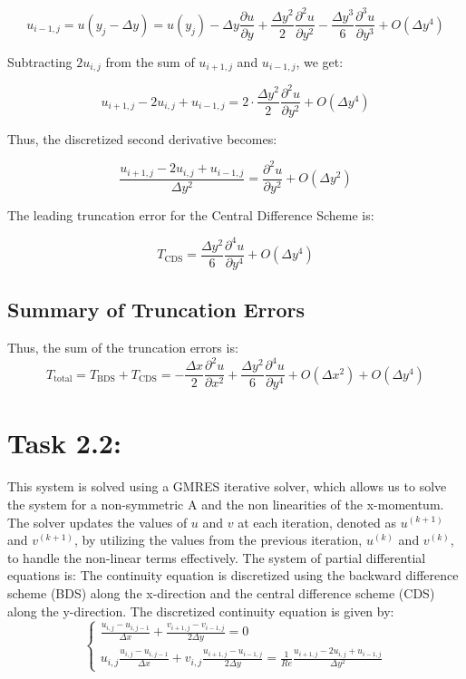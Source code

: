 \documentclass{article}
\begin{document}
\[
u_{i-1,j} = u(y_j - \Delta y) = u(y_j) - \Delta y \frac{\partial u}{\partial y} + \frac{\Delta y^2}{2} \frac{\partial^2 u}{\partial y^2} - \frac{\Delta y^3}{6} \frac{\partial^3 u}{\partial y^3} + O(\Delta y^4)
\]

Subtracting \( 2u_{i,j} \) from the sum of \( u_{i+1,j} \) and \( u_{i-1,j} \), we get:

\[
u_{i+1,j} - 2u_{i,j} + u_{i-1,j} = 2 \cdot \frac{\Delta y^2}{2} \frac{\partial^2 u}{\partial y^2} + O(\Delta y^4)
\]

Thus, the discretized second derivative becomes:

\[
\frac{u_{i+1,j} - 2u_{i,j} + u_{i-1,j}}{\Delta y^2} = \frac{\partial^2 u}{\partial y^2} + O(\Delta y^2)
\]

The leading truncation error for the Central Difference Scheme is:

\[
T_{\text{CDS}} = \frac{\Delta y^2}{6} \frac{\partial^4 u}{\partial y^4} + O(\Delta y^4)
\]
\subsection*{Summary of Truncation Errors}

Thus, the sum of the truncation errors is:
\[
T_{\text{total}} = T_{\text{BDS}} + T_{\text{CDS}} = -\frac{\Delta x}{2} \frac{\partial^2 u}{\partial x^2} + \frac{\Delta y^2}{6} \frac{\partial^4 u}{\partial y^4} + O(\Delta x^2) + O(\Delta y^4)
\]

\section*{\Large Task 2.2:}
This system is solved using a GMRES iterative solver, which allows us to solve the system for a non-symmetric A and the non linearities of the x-momentum.
The solver updates the values of \( u \) and \( v \) at each iteration, denoted as \( u^{(k+1)} \) and \( v^{(k+1)} \), by utilizing the values from the previous iteration, \( u^{(k)} \) and \( v^{(k)} \), to handle the non-linear terms effectively.
The system of partial differential equations is:
The continuity equation is discretized using the backward difference scheme (BDS) along the x-direction and the central difference scheme (CDS) along the y-direction. The discretized continuity equation is given by:
\[
\begin{cases}
  \frac{u_{i,j} - u_{i,j-1}}{\Delta x} + \frac{v_{i+1,j} - v_{i-1,j}}{2 \Delta y} = 0 \\
  u_{i,j}\frac{u_{i,j} - u_{i,j-1}}{\Delta x}  + v_{i,j} \frac{u_{i+1,j} - u_{i-1,j}}{2 \Delta y} = \frac{1}{Re} \frac{u_{i+1,j} - 2u_{i,j} + u_{i-1,j}}{\Delta y^2}
\end{cases}
\]
\end{document}
